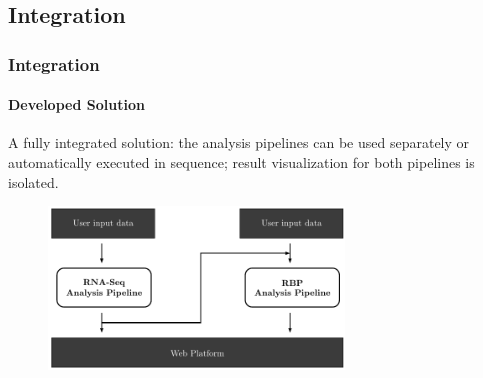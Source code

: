 \documentclass[xcolor=dvipsnames]{beamer}
\begin{document}
\subsection{Integration}
\begin{frame}
  \frametitle{Integration}
  \framesubtitle{Developed Solution}





A fully integrated solution: the analysis pipelines can be used separately or
automatically executed in sequence; result visualization for both pipelines is
isolated.%

\begin{figure}
  \centering
  \includegraphics[width=0.7\textwidth]{integration3}
\end{figure}%


\end{frame}
\end{document}
